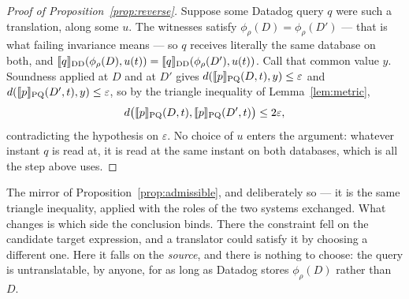 \begin{proof}[Proof of Proposition~\ref{prop:reverse}]
Suppose some Datadog query $q$ were such a translation, along some $u$. The witnesses
satisfy $\phi_\rho(D)=\phi_\rho(D')$ --- that is what failing invariance means --- so $q$
receives literally the same database on both, and
$\llbracket q \rrbracket_{\mathrm{DD}}(\phi_\rho(D),u(t))=\llbracket q \rrbracket_{\mathrm{DD}}(\phi_\rho(D'),u(t))$.
Call that common value $y$. Soundness applied at $D$ and at $D'$ gives
$d(\llbracket p \rrbracket_{\mathrm{PQ}}(D,t),y)\le\varepsilon$ and
$d(\llbracket p \rrbracket_{\mathrm{PQ}}(D',t),y)\le\varepsilon$, so by the triangle inequality of
Lemma~\ref{lem:metric},
\[
d\big(\llbracket p \rrbracket_{\mathrm{PQ}}(D,t),\llbracket p \rrbracket_{\mathrm{PQ}}(D',t)\big)\le 2\varepsilon ,
\]
contradicting the hypothesis on $\varepsilon$. No choice of $u$ enters the argument:
whatever instant $q$ is read at, it is read at the same instant on both databases, which
is all the step above uses.
\end{proof}

\noindent
The mirror of Proposition~\ref{prop:admissible}, and deliberately so --- it is the same
triangle inequality, applied with the roles of the two systems exchanged. What changes is
which side the conclusion binds. There the constraint fell on the candidate target
expression, and a translator could satisfy it by choosing a different one. Here it falls
on the \emph{source}, and there is nothing to choose: the query is untranslatable, by
anyone, for as long as Datadog stores $\phi_\rho(D)$ rather than $D$.
